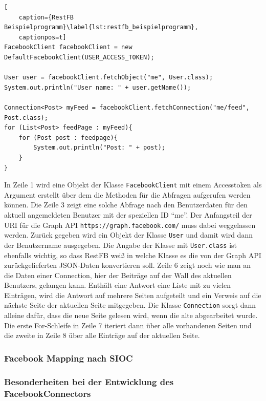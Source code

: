 \begin{lstlisting}[
    caption={RestFB Beispielprogramm}\label{lst:restfb_beispielprogramm},
    captionpos=t]
FacebookClient facebookClient = new DefaultFacebookClient(USER_ACCESS_TOKEN);

User user = facebookClient.fetchObject("me", User.class);
System.out.println("User name: " + user.getName());

Connection<Post> myFeed = facebookClient.fetchConnection("me/feed", Post.class);
for (List<Post> feedPage : myFeed){
    for (Post post : feedpage){
        System.out.println("Post: " + post);
    }
}
\end{lstlisting} 

In Zeile 1 wird eine Objekt der Klasse \texttt{FacebookClient} mit einem Accesstoken als Argument erstellt über dem die Methoden für die Abfragen aufgerufen werden können. Die Zeile 3 zeigt eine solche Abfrage nach den Benutzerdaten für den aktuell angemeldeten Benutzer mit der speziellen ID \enquote{me}. Der Anfangsteil der URI für die Graph API \texttt{https://graph.facebook.com/} muss dabei weggelassen werden. Zurück gegeben wird ein Objekt der Klasse \texttt{User} und damit wird dann der Benutzername ausgegeben. Die Angabe der Klasse mit \texttt{User.class} ist ebenfalls wichtig, so dass RestFB weiß in welche Klasse es die von der Graph API zurückgelieferten JSON-Daten konvertieren soll. Zeile 6 zeigt noch wie man an die Daten einer Connection, hier der Beiträge auf der Wall des aktuellen Benutzers, gelangen kann. Enthält eine Antwort eine Liste mit zu vielen Einträgen, wird die Antwort auf mehrere Seiten aufgeteilt und ein Verweis auf die nächste Seite der aktuellen Seite mitgegeben. Die Klasse \texttt{Connection} sorgt dann alleine dafür, dass die neue Seite gelesen wird, wenn die alte abgearbeitet wurde. Die erste For-Schleife in Zeile 7 iteriert dann über alle vorhandenen Seiten und die zweite in Zeile 8 über alle Einträge auf der aktuellen Seite.


\subsubsection{Facebook Mapping nach SIOC} %
\label{ssub:facebook_mapping_nach_sioc}


\subsubsection{Besonderheiten bei der Entwicklung des FacebookConnectors} %
\label{ssub:besonderheiten_bei_der_entwicklung_des_facebookconnectors}



